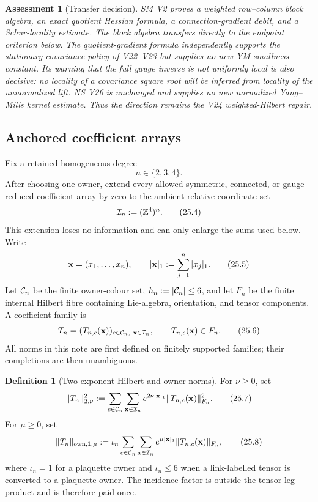 \documentclass[11pt,oneside]{book}
\newtheorem{assessment}[theorem]{Assessment}
\theoremstyle{definition}
\newtheorem{definition}[theorem]{Definition}
\theoremstyle{remark}
\begin{document}
\begin{assessment}[Transfer decision]
\label{ass:e8v25-transfer}
SM V2 proves a weighted row--column block algebra, an exact quotient
Hessian formula, a connection-gradient debit, and a Schur-locality
estimate.  The block algebra transfers directly to the endpoint
criterion below.  The quotient-gradient formula independently supports
the stationary-covariance policy of V22--V23 but supplies no new YM
smallness constant.  Its warning that the full gauge inverse is not
uniformly local is also decisive: no locality of a covariance square
root will be inferred from locality of the unnormalized lift.
NS V26 is unchanged and supplies no new normalized Yang--Mills kernel
estimate.  Thus the direction remains the V24 weighted-Hilbert repair.
\end{assessment}

\subsection{Anchored coefficient arrays}

Fix a retained homogeneous degree
\[
                              n\in\{2,3,4\}.                       \tag{25.3}
\]
After choosing one owner, extend every allowed symmetric, connected,
or gauge-reduced coefficient array by zero to the ambient relative
coordinate set
\[
                    {\cal I}_n:=({\mathbb Z}^4)^n.                 \tag{25.4}
\]
This extension loses no information and can only enlarge the sums used
below.  Write
\[
 {\bf x}=(x_1,\ldots,x_n),\qquad
 |{\bf x}|_1:=\sum_{j=1}^n|x_j|_1.                                \tag{25.5}
\]
Let \({\cal C}_n\) be the finite owner-colour set,
\(h_n:=|{\cal C}_n|\leq6\), and let \(F_n\) be the finite internal
Hilbert fibre containing Lie-algebra, orientation, and tensor
components.  A coefficient family is
\[
                  T_n=(T_{n,c}({\bf x}))_{
                  c\in{\cal C}_n,\ {\bf x}\in{\cal I}_n},
       \qquad T_{n,c}({\bf x})\in F_n.                             \tag{25.6}
\]
All norms in this note are first defined on finitely supported
families; their completions are then unambiguous.

\begin{definition}[Two-exponent Hilbert and owner norms]
\label{def:e8v25-two-exponent}
For \(\nu\geq0\), set
\[
 \|T_n\|_{2,\nu}^2
 :=\sum_{c\in{\cal C}_n}\sum_{{\bf x}\in{\cal I}_n}
       e^{2\nu|{\bf x}|_1}\|T_{n,c}({\bf x})\|_{F_n}^2.            \tag{25.7}
\]
For \(\mu\geq0\), set
\[
 \|T_n\|_{{\rm own},1,\mu}
 :=\iota_n\sum_{c\in{\cal C}_n}\sum_{{\bf x}\in{\cal I}_n}
       e^{\mu|{\bf x}|_1}\|T_{n,c}({\bf x})\|_{F_n},              \tag{25.8}
\]
where \(\iota_n=1\) for a plaquette owner and
\(\iota_n\leq6\) when a link-labelled tensor is converted to a
plaquette owner.  The incidence factor is outside the tensor-leg
product and is therefore paid once.
\end{definition}
\end{document}
